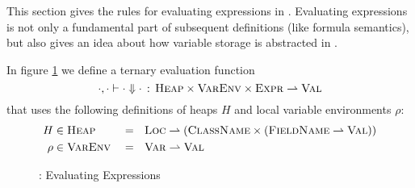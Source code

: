 This section gives the rules for evaluating expressions in \svlidf.
Evaluating expressions is not only a fundamental part of subsequent definitions (like formula semantics), but also gives an idea about how variable storage is abstracted in \svlidf.

In figure \ref{fig:eval-expr} we define a ternary evaluation function 
$$\cdot, \cdot \vdash \cdot \Downarrow \cdot \,:\, \textup{\textsc{Heap}} \times \textup{\textsc{VarEnv}} \times \textup{\textsc{Expr}} \rightharpoonup \textup{\textsc{Val}}$$
that uses the following definitions of heaps $H$ and local variable environments $\rho$:
\begin{align*}
	H    & \in \textup{\textsc{Heap}}   &  & =~~ \textup{\textsc{Loc}} \rightharpoonup (\textup{\textsc{ClassName}} \times (\textup{\textsc{FieldName}} \rightharpoonup \textup{\textsc{Val}})) \\
	\rho & \in \textup{\textsc{VarEnv}} &  & =~~ \textup{\textsc{Var}} \rightharpoonup \textup{\textsc{Val}}
\end{align*}

\begin{figure}
    
    \caption{\svlidf: Evaluating Expressions}
    \label{fig:eval-expr}
\end{figure}